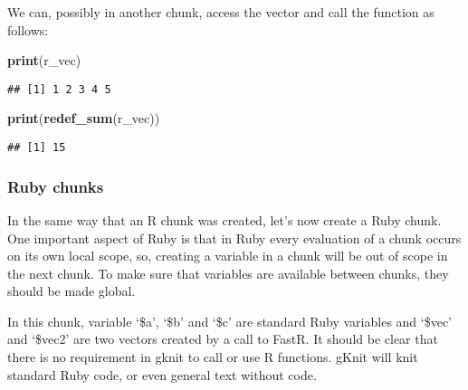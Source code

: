 \documentclass[]{article}
\newenvironment{Shaded}{\begin{snugshade}}{\end{snugshade}}
\newcommand{\KeywordTok}[1]{\textcolor[rgb]{0.13,0.29,0.53}{\textbf{#1}}}
\newcommand{\DataTypeTok}[1]{\textcolor[rgb]{0.13,0.29,0.53}{#1}}
\newcommand{\DecValTok}[1]{\textcolor[rgb]{0.00,0.00,0.81}{#1}}
\newcommand{\StringTok}[1]{\textcolor[rgb]{0.31,0.60,0.02}{#1}}
\newcommand{\NormalTok}[1]{#1}
\begin{document}
We can, possibly in another chunk, access the vector and call the
function as follows:

\begin{Shaded}
\begin{Highlighting}[]
\KeywordTok{print}\NormalTok{(r_vec)}
\end{Highlighting}
\end{Shaded}

\begin{verbatim}
## [1] 1 2 3 4 5
\end{verbatim}

\begin{Shaded}
\begin{Highlighting}[]
\KeywordTok{print}\NormalTok{(}\KeywordTok{redef_sum}\NormalTok{(r_vec))}
\end{Highlighting}
\end{Shaded}

\begin{verbatim}
## [1] 15
\end{verbatim}

\subsubsection{Ruby chunks}\label{ruby-chunks}

In the same way that an R chunk was created, let's now create a Ruby
chunk. One important aspect of Ruby is that in Ruby every evaluation of
a chunk occurs on its own local scope, so, creating a variable in a
chunk will be out of scope in the next chunk. To make sure that
variables are available between chunks, they should be made global.

In this chunk, variable `\$a', `\$b' and `\$c' are standard Ruby
variables and `\$vec' and `\$vec2' are two vectors created by a call to
FastR. It should be clear that there is no requirement in gknit to call
or use R functions. gKnit will knit standard Ruby code, or even general
text without code.

\begin{Shaded}
\end{Shaded}
\end{document}
